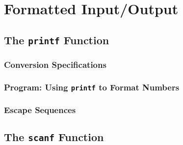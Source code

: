 \documentclass[../main.tex]{subfiles}
\begin{document}
\section{Formatted Input/Output}

\subsection{The \texttt{printf} Function}
\subsubsection*{Conversion Specifications}
\subsubsection*{Program: Using \texttt{printf} to Format Numbers}
\subsubsection*{Escape Sequences}

\subsection{The \texttt{scanf} Function}
\end{document}
